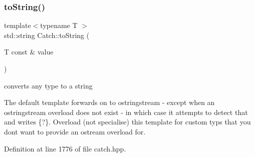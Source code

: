 \hypertarget{namespace_catch_adbd1730f961da94d9ed284f70fd7a28b}{}\label{namespace_catch_adbd1730f961da94d9ed284f70fd7a28b} 
\subsubsection{\texorpdfstring{to\+String()}{toString()}\hspace{0.1cm}{\footnotesize\ttfamily [1/17]}}
{\footnotesize\ttfamily template$<$typename T $>$ \\
std\+::string Catch\+::to\+String (\begin{DoxyParamCaption}\item[{T const \&}]{value }\end{DoxyParamCaption})}



converts any type to a string 

The default template forwards on to ostringstream -\/ except when an ostringstream overload does not exist -\/ in which case it attempts to detect that and writes \{?\}. Overload (not specialise) this template for custom typs that you don\textquotesingle{}t want to provide an ostream overload for. 

Definition at line 1776 of file catch.\+hpp.

